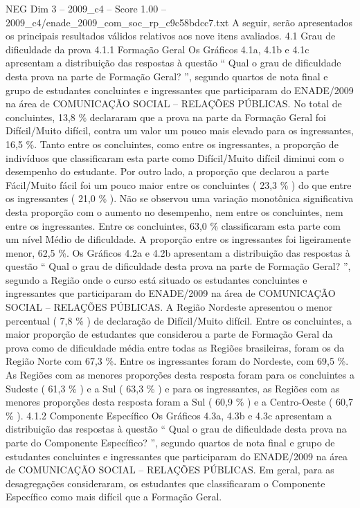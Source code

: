 \begin{textsample}{NEG Dim 3 – 2009\_c4 – Score 1.00 – 2009\_c4/enade\_2009\_com\_soc\_rp\_c9c58bdcc7.txt}
A seguir, serão apresentados os principais resultados válidos relativos aos nove itens avaliados. 4.1 Grau de dificuldade da prova 4.1.1 Formação Geral Os Gráficos 4.1a, 4.1b e 4.1c apresentam a distribuição das respostas à questão “ Qual o grau de dificuldade desta prova na parte de Formação Geral? ”, segundo quartos de nota final e grupo de estudantes concluintes e ingressantes que participaram do ENADE/2009 na área de COMUNICAÇÃO SOCIAL – RELAÇÕES PÚBLICAS.
No total de concluintes, 13,8 \% declararam que a prova na parte da Formação Geral foi Difícil/Muito difícil, contra um valor um pouco mais elevado para os ingressantes, 16,5 \%.
Tanto entre os concluintes, como entre os ingressantes, a proporção de indivíduos que classificaram esta parte como Difícil/Muito difícil diminui com o desempenho do estudante.
Por outro lado, a proporção que declarou a parte Fácil/Muito fácil foi um pouco maior entre os concluintes ( 23,3 \% ) do que entre os ingressantes ( 21,0 \% ).
Não se observou uma variação monotônica significativa desta proporção com o aumento no desempenho, nem entre os concluintes, nem entre os ingressantes.
Entre os concluintes, 63,0 \% classificaram esta parte com um nível Médio de dificuldade.
A proporção entre os ingressantes foi ligeiramente menor, 62,5 \%.
Os Gráficos 4.2a e 4.2b apresentam a distribuição das respostas à questão “ Qual o grau de dificuldade desta prova na parte de Formação Geral? ”, segundo a Região onde o curso está situado os estudantes concluintes e ingressantes que participaram do ENADE/2009 na área de COMUNICAÇÃO SOCIAL – RELAÇÕES PÚBLICAS.
A Região Nordeste apresentou o menor percentual ( 7,8 \% ) de declaração de Difícil/Muito difícil.
Entre os concluintes, a maior proporção de estudantes que considerou a parte de Formação Geral da prova como de dificuldade média entre todas as Regiões brasileiras, foram os da Região Norte com 67,3 \%.
Entre os ingressantes foram do Nordeste, com 69,5 \%.
As Regiões com as menores proporções desta resposta foram para os concluintes a Sudeste ( 61,3 \% ) e a Sul ( 63,3 \% ) e para os ingressantes, as Regiões com as menores proporções desta resposta foram a Sul ( 60,9 \% ) e a Centro-Oeste ( 60,7 \% ). 4.1.2 Componente Específico Os Gráficos 4.3a, 4.3b e 4.3c apresentam a distribuição das respostas à questão “ Qual o grau de dificuldade desta prova na parte do Componente Específico? ”, segundo quartos de nota final e grupo de estudantes concluintes e ingressantes que participaram do ENADE/2009 na área de COMUNICAÇÃO SOCIAL – RELAÇÕES PÚBLICAS.
Em geral, para as desagregações consideraram, os estudantes que classificaram o Componente Específico como mais difícil que a Formação Geral.

\end{textsample}
